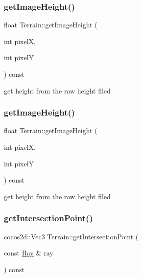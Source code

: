 \subsubsection{\texorpdfstring{get\+Image\+Height()}{getImageHeight()}\hspace{0.1cm}{\footnotesize\ttfamily [1/2]}}
{\footnotesize\ttfamily float Terrain\+::get\+Image\+Height (\begin{DoxyParamCaption}\item[{int}]{pixelX,  }\item[{int}]{pixelY }\end{DoxyParamCaption}) const}

get height from the raw height filed \mbox{\label{classTerrain_adbe691cc944f4d85745e2ab1f1f4f8ff}} 
\subsubsection{\texorpdfstring{get\+Image\+Height()}{getImageHeight()}\hspace{0.1cm}{\footnotesize\ttfamily [2/2]}}
{\footnotesize\ttfamily float Terrain\+::get\+Image\+Height (\begin{DoxyParamCaption}\item[{int}]{pixelX,  }\item[{int}]{pixelY }\end{DoxyParamCaption}) const}

get height from the raw height filed \mbox{\label{classTerrain_ac958f761c3a0ffd913b6d201337fecc7}} 
\subsubsection{\texorpdfstring{get\+Intersection\+Point()}{getIntersectionPoint()}\hspace{0.1cm}{\footnotesize\ttfamily [1/4]}}
{\footnotesize\ttfamily cocos2d\+::\+Vec3 Terrain\+::get\+Intersection\+Point (\begin{DoxyParamCaption}\item[{const \hyperlink{classRay}{Ray} \&}]{ray }\end{DoxyParamCaption}) const}

